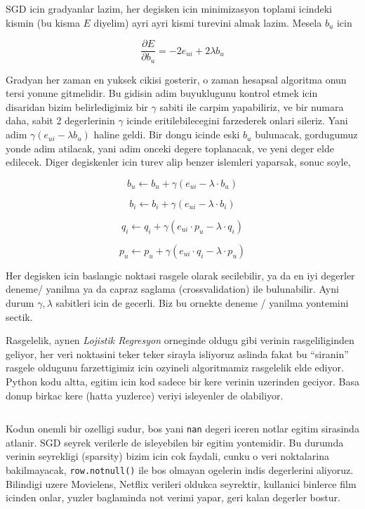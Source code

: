 \documentclass[12pt,fleqn]{article}\usepackage{../common}
\begin{document}
SGD icin gradyanlar lazim, her degisken icin minimizasyon toplami icindeki
kismin (bu kisma $E$ diyelim) ayri ayri kismi turevini almak lazim. Mesela
$b_u$ icin

$$ \frac{\partial E}{\partial b_u}  = -2e_{ui} + 2 \lambda b_u
$$

Gradyan her zaman en yuksek cikisi gosterir, o zaman hesapsal algoritma
onun tersi yonune gitmelidir. Bu gidisin adim buyuklugunu kontrol etmek
icin disaridan bizim belirledigimiz bir $\gamma$ sabiti ile carpim
yapabiliriz, ve bir numara daha, sabit 2 degerlerinin $\gamma$ icinde
eritilebilecegini farzederek onlari sileriz. Yani adim $\gamma(e_{ui} -
\lambda b_u)$ haline geldi. Bir dongu icinde eski $b_u$ bulunacak,
gordugumuz yonde adim atilacak, yani adim onceki degere toplanacak, ve yeni
deger elde edilecek. Diger degiskenler icin turev alip benzer islemleri
yaparsak, sonuc soyle,

$$ b_u \leftarrow b_u + \gamma (e_{ui} - \lambda \cdot b_u) $$

$$ b_i \leftarrow b_i + \gamma (e_{ui} - \lambda \cdot b_i) $$

$$ q_i \leftarrow q_i + \gamma (e_{ui}\cdot p_u - \lambda \cdot q_i) $$

$$ p_u \leftarrow p_u + \gamma (e_{ui}\cdot q_i - \lambda \cdot p_u) $$

Her degisken icin baslangic noktasi rasgele olarak secilebilir, ya da en
iyi degerler deneme/ yanilma ya da capraz saglama (crossvalidation) ile
bulunabilir. Ayni durum $\gamma,\lambda$ sabitleri icin de gecerli. Biz bu
ornekte deneme / yanilma yontemini sectik.

Rasgelelik, aynen {\em Lojistik Regresyon} orneginde oldugu gibi verinin
rasgeliliginden geliyor, her veri noktasini teker teker sirayla isliyoruz
aslinda fakat bu ``siranin'' rasgele oldugunu farzettigimiz icin ozyineli 
algoritmamiz rasgelelik elde ediyor. Python kodu altta, egitim icin kod
sadece bir kere verinin uzerinden geciyor. Basa donup birkac kere (hatta
yuzlerce) veriyi isleyenler de olabiliyor.

\inputminted[fontsize=\footnotesize]{python}{ssvd.py}

Kodun onemli bir ozelligi sudur, bos yani \verb!nan! degeri iceren notlar
egitim sirasinda atlanir. SGD seyrek verilerle de isleyebilen bir egitim
yontemidir. Bu durumda verinin seyrekligi (sparsity) bizim icin cok
faydali, cunku o veri noktalarina bakilmayacak, \verb!row.notnull()! ile
bos olmayan ogelerin indis degerlerini aliyoruz. Bilindigi uzere Movielens,
Netflix verileri oldukca seyrektir, kullanici binlerce film icinden onlar,
yuzler baglaminda not verimi yapar, geri kalan degerler bostur. 
\end{document}
